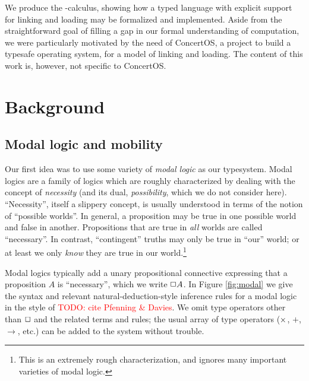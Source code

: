 \documentclass[11pt]{article}
\newcommand{\todo}[1]{\textcolor{red}{\small TODO: #1}}
\begin{document}
We produce the \llib{}-calculus, showing how a typed language with explicit
support for linking and loading may be formalized and implemented. Aside from
the straightforward goal of filling a gap in our formal understanding of
computation, we were particularly motivated by the need of ConcertOS, a project
to build a typesafe operating system, for a model of linking and loading. The
content of this work is, however, not specific to ConcertOS.



%
%


\section{Background}

\subsection{Modal logic and mobility}

Our first idea was to use some variety of \emph{modal logic} as our typesystem.
Modal logics are a family of logics which are roughly characterized by dealing
with the concept of \emph{necessity} (and its dual, \emph{possibility}, which we
do not consider here). ``Necessity'', itself a slippery concept, is usually
understood in terms of the notion of ``possible worlds''. In general, a
proposition may be true in one possible world and false in another. Propositions
that are true in \emph{all} worlds are called ``necessary''. In contrast,
``contingent'' truths may only be true in ``our'' world; or at least we only
\emph{know} they are true in our world.\footnote{This is an extremely rough
  characterization, and ignores many important varieties of modal logic.}

Modal logics typically add a unary propositional connective expressing that a
proposition $A$ is ``necessary'', which we write $\Box A$. In Figure
\ref{fig:modal} we give the syntax and relevant natural-deduction-style
inference rules for a modal logic in the style of \todo{cite Pfenning \&
  Davies}. We omit type operators other than $\Box$ and the related terms and
rules; the usual array of type operators ($\times$, $+$, $\to$, etc.) can be added
to the system without trouble.
\end{document}
